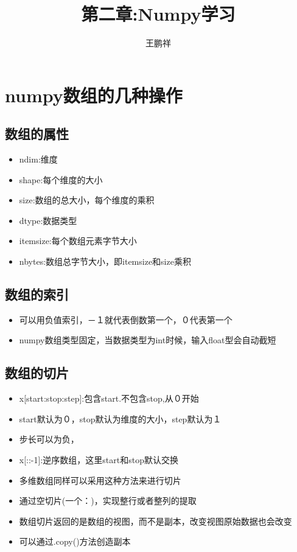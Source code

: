 \documentclass{article}
\begin{document}
\title{第二章:Numpy学习}
\author{王鹏祥}
\date{\chntoday}
\maketitle
\tableofcontents
\newpage
\section{numpy数组的几种操作}
\subsection{数组的属性}

\begin{itemize}
\item ndim:维度
\item shape:每个维度的大小
\item size:数组的总大小，每个维度的乘积
\item dtype:数据类型
\item itemsize:每个数组元素字节大小
\item nbytes:数组总字节大小，即itemsize和size乘积
\end{itemize}

\subsection{数组的索引}

\begin{itemize}
\item 可以用负值索引，－１就代表倒数第一个，０代表第一个
\item {\color{red} numpy数组类型固定，当数据类型为int时候，输入float型会自动截短}

\end{itemize}

\subsection{数组的切片}

\begin{itemize}
\item x[start:stop:step]:{\color{red}包含start.不包含stop,从０开始}
\item start默认为０，stop默认为维度的大小，step默认为１
\item 步长可以为负，
\item x[::-1]:逆序数组，这里start和stop默认交换
\item 多维数组同样可以采用这种方法来进行切片
\item 通过空切片(一个：)，实现整行或者整列的提取
\item {\color{red}数组切片返回的是数组的视图，而不是副本，改变视图原始数据也会改变}
\item 可以通过.copy()方法创造副本
\end{itemize}
\end{document}
